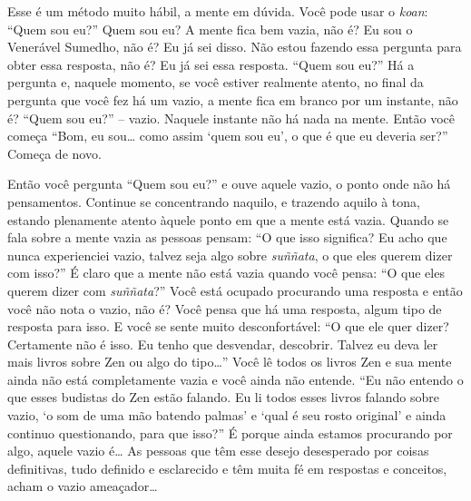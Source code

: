 Esse é um método muito hábil, a mente em dúvida. Você pode usar o
\textit{koan}: “Quem sou eu?” Quem sou eu? A mente fica bem vazia, não
é? Eu sou o Venerável Sumedho, não é? Eu já sei disso. Não estou
fazendo essa pergunta para obter essa resposta, não é? Eu já sei essa
resposta. “Quem sou eu?” Há a pergunta e, naquele momento, se você
estiver realmente atento, no final da pergunta que você fez há um
vazio, a mente fica em branco por um instante, não é? “Quem sou eu?” –
vazio. Naquele instante não há nada na mente. Então você começa “Bom,
eu sou… como assim ‘quem sou eu’, o que é que eu deveria ser?” Começa
de novo.

Então você pergunta “Quem sou eu?” e ouve aquele vazio, o ponto onde
não há pensamentos. Continue se concentrando naquilo, e trazendo aquilo
à tona, estando plenamente atento àquele ponto em que a mente está
vazia. Quando se fala sobre a mente vazia as pessoas pensam: “O que
isso significa? Eu acho que nunca experienciei vazio, talvez seja algo
sobre \textit{suññata}, o que eles querem dizer com isso?” É claro que
a mente não está vazia quando você pensa: “O que eles querem dizer com
\textit{suññata}?” Você está ocupado procurando uma resposta e então
você não nota o vazio, não é? Você pensa que há uma resposta, algum
tipo de resposta para isso. E você se sente muito desconfortável: “O
que ele quer dizer? Certamente não é isso. Eu tenho que desvendar,
descobrir. Talvez eu deva ler mais livros sobre Zen ou algo do tipo…”
Você lê todos os livros Zen e sua mente ainda não está completamente
vazia e você ainda não entende. “Eu não entendo o que esses budistas do
Zen estão falando. Eu li todos esses livros falando sobre vazio, ‘o som
de uma mão batendo palmas’ e ‘qual é seu rosto original’ e ainda
continuo questionando, para que isso?” É porque ainda estamos
procurando por algo, aquele vazio é… As pessoas que têm esse desejo
desesperado por coisas definitivas, tudo definido e esclarecido e têm
muita fé em respostas e conceitos, acham o vazio ameaçador…

